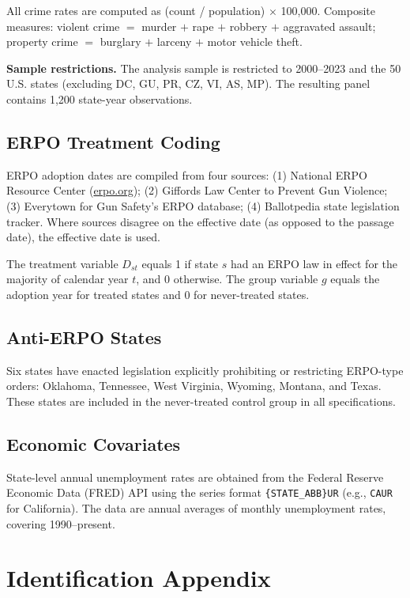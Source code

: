 \documentclass[12pt]{article}
\begin{document}
All crime rates are computed as (count / population) $\times$ 100,000. Composite measures: violent crime $=$ murder $+$ rape $+$ robbery $+$ aggravated assault; property crime $=$ burglary $+$ larceny $+$ motor vehicle theft.

\textbf{Sample restrictions.} The analysis sample is restricted to 2000--2023 and the 50 U.S. states (excluding DC, GU, PR, CZ, VI, AS, MP). The resulting panel contains 1,200 state-year observations.

\subsection{ERPO Treatment Coding}

ERPO adoption dates are compiled from four sources: (1) National ERPO Resource Center (\url{erpo.org}); (2) Giffords Law Center to Prevent Gun Violence; (3) Everytown for Gun Safety's ERPO database; (4) Ballotpedia state legislation tracker. Where sources disagree on the effective date (as opposed to the passage date), the effective date is used.

The treatment variable $D_{st}$ equals 1 if state $s$ had an ERPO law in effect for the majority of calendar year $t$, and 0 otherwise. The group variable $g$ equals the adoption year for treated states and 0 for never-treated states.

\subsection{Anti-ERPO States}

Six states have enacted legislation explicitly prohibiting or restricting ERPO-type orders: Oklahoma, Tennessee, West Virginia, Wyoming, Montana, and Texas. These states are included in the never-treated control group in all specifications.

\subsection{Economic Covariates}

State-level annual unemployment rates are obtained from the Federal Reserve Economic Data (FRED) API using the series format \texttt{\{STATE\_ABB\}UR} (e.g., \texttt{CAUR} for California). The data are annual averages of monthly unemployment rates, covering 1990--present.


\section{Identification Appendix}
\end{document}
